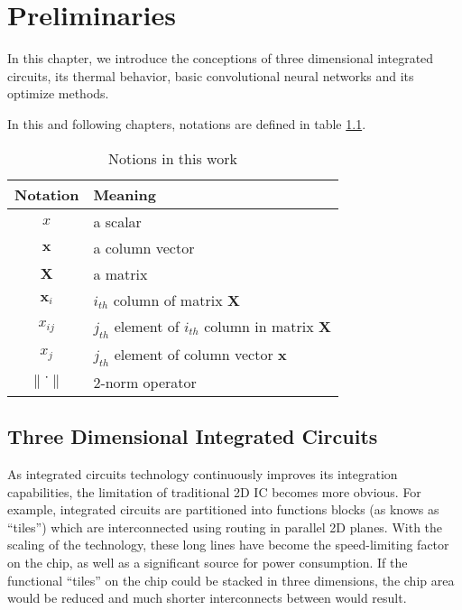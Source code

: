 

\chapter{Preliminaries}
In this chapter, we introduce the conceptions of three dimensional integrated circuits, its thermal behavior, 
basic convolutional neural networks and its optimize methods.

In this and following chapters, notations are defined in table \ref{tab::Notaion}.

\begin{table}[htb]
    \centering
    \begin{tabular}{c | l}
        \toprule
        Notation & Meaning \\
        \midrule
        $x$ & a scalar \\
        $\mathbf{x}$ & a column vector \\
        $\mathbf{X}$ & a matrix \\
        $\mathbf{x}_i$ & $i_{th}$ column of matrix $\mathbf{X}$ \\
        $x_{ij}$ & $j_{th}$ element of $i_{th}$ column in matrix $\mathbf{X}$ \\ 
        $x_j$ & $j_{th}$ element of column vector $\mathbf{x}$ \\
        $\left\|\cdot\right\|$ & 2-norm operator \\
        \bottomrule
    \end{tabular}
    \caption{Notions in this work}
    \label{tab::Notaion}
\end{table}

\section{Three Dimensional Integrated Circuits} \label{sec::3DIC}
As integrated circuits technology continuously improves its integration capabilities,
the limitation of traditional 2D IC becomes more obvious.
For example, integrated circuits are partitioned into functions blocks (as knows as ``tiles'')
which are interconnected using routing in parallel 2D planes.
With the scaling of the technology, these long lines
have become the speed-limiting factor on the chip, as well as a significant
source for power consumption. If the functional ``tiles'' on the
chip could be stacked in three dimensions, the chip area would be
reduced and much shorter interconnects between would result.

